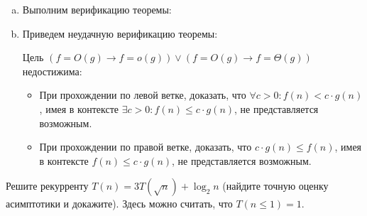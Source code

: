 \begin{solution}
    \leavevmode\vspace{1pt}

    \begin{enumerate}[(a)]
        \item Выполним верификацию теоремы:
            \leavevmode\vspace{1pt}
            
            \qedsymbol

        \item Приведем неудачную верификацию теоремы:
            \leavevmode\vspace{1pt}
            

            Цель $(f = O(g) \rightarrow f = o(g)) \lor (f = O(g) \rightarrow f = \Theta(g))$ недостижима:

            \begin{itemize}
                \item При прохождении по левой ветке, доказать, что $\forall c > 0 : f(n) < c \cdot g(n)$, имея в контексте $\exists c > 0 : f(n) \le c \cdot g(n)$, не представляется возможным.

                \item При прохождении по правой ветке, доказать, что $c \cdot g(n) \le f(n)$, имея в контексте $f(n) \le c \cdot g(n)$, не представляется возможным.
            \end{itemize}
    \end{enumerate}
\end{solution}


\begin{problem}
    Решите рекурренту $T(n) = 3 T(\sqrt{n}) + \log_2 n$ (найдите точную оценку асимптотики и докажите). Здесь можно считать, что $T(n \le 1) = 1$.
\end{problem}

